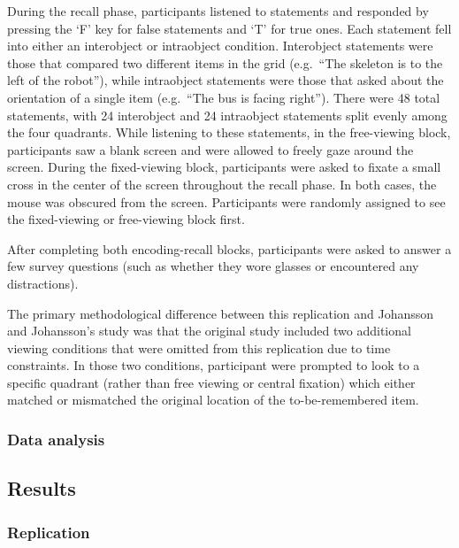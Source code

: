 \documentclass[
  english,
  man,floatsintext]{apa6}
\begin{document}
During the recall phase, participants listened to statements and responded by pressing the `F' key for false statements and `T' for true ones. Each statement fell into either an interobject or intraobject condition. Interobject statements were those that compared two different items in the grid (e.g.~``The skeleton is to the left of the robot''), while intraobject statements were those that asked about the orientation of a single item (e.g.~``The bus is facing right''). There were 48 total statements, with 24 interobject and 24 intraobject statements split evenly among the four quadrants. While listening to these statements, in the free-viewing block, participants saw a blank screen and were allowed to freely gaze around the screen. During the fixed-viewing block, participants were asked to fixate a small cross in the center of the screen throughout the recall phase. In both cases, the mouse was obscured from the screen. Participants were randomly assigned to see the fixed-viewing or free-viewing block first.

After completing both encoding-recall blocks, participants were asked to answer a few survey questions (such as whether they wore glasses or encountered any distractions).

The primary methodological difference between this replication and Johansson and Johansson's study was that the original study included two additional viewing conditions that were omitted from this replication due to time constraints. In those two conditions, participant were prompted to look to a specific quadrant (rather than free viewing or central fixation) which either matched or mismatched the original location of the to-be-remembered item.

\hypertarget{data-analysis}{%
\subsubsection{Data analysis}\label{data-analysis}}

\hypertarget{results-1}{%
\subsection{Results}\label{results-1}}

\hypertarget{replication-1}{%
\subsubsection{Replication}\label{replication-1}}
\end{document}
